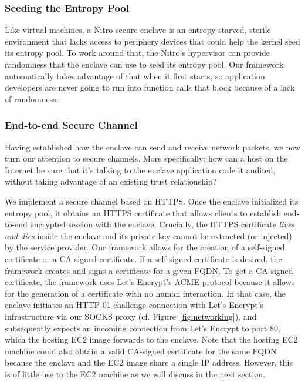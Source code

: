 \subsubsection{Seeding the Entropy Pool}
\label{sec:entropy}

Like virtual machines, a Nitro secure enclave is an entropy-starved, sterile environment that lacks access to periphery devices that could help the kernel seed its entropy pool.  To work around that, the Nitro's hypervisor can provide randomness that the enclave can use to seed its entropy pool.  Our framework automatically takes advantage of that when it first starts, so application developers are never going to run into function calls that block because of a lack of randomness.

\subsubsection{End-to-end Secure Channel}
\label{sec:cert}

Having established how the enclave can send and receive network packets, we now turn our attention to secure channels.  More specifically: how can a host on the Internet be sure that it's talking to the enclave application code it audited, without taking advantage of an existing trust relationship?

We implement a secure channel based on HTTPS.  Once the enclave initialized its entropy pool, it obtains an HTTPS certificate that allows clients to establish end-to-end encrypted session with the enclave.  Crucially, the HTTPS certificate \emph{lives and dies} inside the enclave and its private key cannot be extracted (or injected) by the service provider.  Our framework allows for the creation of a self-signed certificate or a CA-signed certificate.  If a self-signed certificate is desired, the framework creates and signs a certificate for a given FQDN.  To get a CA-signed certificate, the framework uses Let's Encrypt's ACME protocol because it allows for the generation of a certificate with no human interaction.  In that case, the enclave initiates an HTTP-01 challenge connection with Let's Encrypt's infrastructure via our SOCKS proxy (cf. Figure~\ref{fig:networking}), and subsequently expects an incoming connection from Let's Encrypt to port 80, which the hosting EC2 image forwards to the enclave.  Note that the hosting EC2 machine could also obtain a valid CA-signed certificate for the same FQDN because the enclave and the EC2 image share a single IP address.  However, this is of little use to the EC2 machine as we will discuss in the next section.

